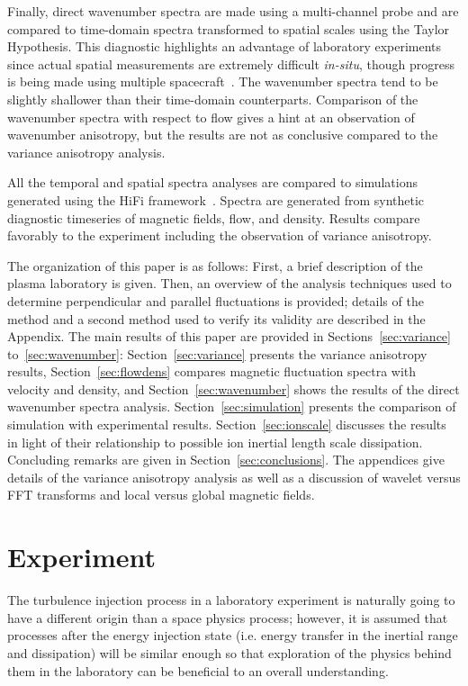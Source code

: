 \documentclass[aip,prl,amsmath,amssymb,reprint,superscriptaddress]{revtex4-1} %
\begin{document}
Finally, direct wavenumber spectra are made using a multi-channel probe and are compared to time-domain spectra transformed to spatial scales using the Taylor Hypothesis. This diagnostic highlights an advantage of laboratory experiments since actual spatial measurements are extremely difficult {\it in-situ}, though progress is being made using multiple spacecraft~\cite{sahraoui06,sahraoui10}.  The wavenumber spectra tend to be slightly shallower than their time-domain counterparts. Comparison of the wavenumber spectra with respect to flow gives a hint at an observation of wavenumber anisotropy, but the results are not as conclusive compared to the variance anisotropy analysis.

All the temporal and spatial spectra analyses are compared to simulations generated using the HiFi framework~\cite{schaffner14a}. Spectra are generated from synthetic diagnostic timeseries of magnetic fields, flow, and density. Results compare favorably to the experiment including the observation of variance anisotropy.

The organization of this paper is as follows: First, a brief description of the plasma laboratory is given. Then, an overview of the analysis techniques used to determine perpendicular and parallel fluctuations is provided; details of the method and a second method used to verify its validity are described in the Appendix. The main results of this paper are provided in Sections~\ref{sec:variance} to~\ref{sec:wavenumber}: Section~\ref{sec:variance} presents the variance anisotropy results, Section~\ref{sec:flowdens} compares magnetic fluctuation spectra with velocity and density, and Section~\ref{sec:wavenumber} shows the results of the direct wavenumber spectra analysis. Section~\ref{sec:simulation} presents the comparison of simulation with experimental results. Section~\ref{sec:ionscale} discusses the results in light of their relationship to possible ion inertial length scale dissipation. Concluding remarks are given in Section~\ref{sec:conclusions}. The appendices give details of the variance anisotropy analysis as well as a discussion of wavelet versus FFT transforms and local versus global magnetic fields.

\section{Experiment}\label{sec:experiment}

The turbulence injection process in a laboratory experiment is naturally going to have a different origin than a space physics process; however, it is assumed that processes after the energy injection state (i.e. energy transfer in the inertial range and dissipation) will be similar enough so that exploration of the physics behind them in the laboratory can be beneficial to an overall understanding.
\end{document}
